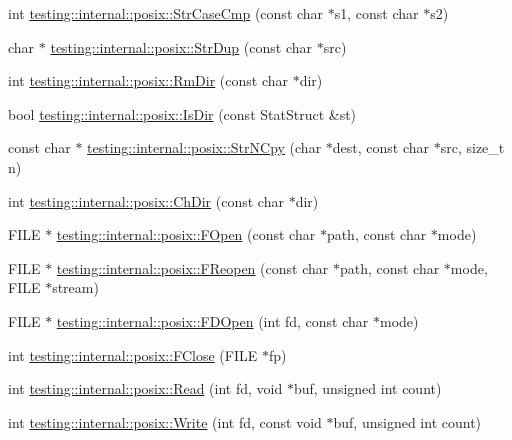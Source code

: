 \begin{DoxyCompactItemize}
\item 
int \mbox{\hyperlink{namespacetesting_1_1internal_1_1posix_a1ef2385a7f8e4c706054da35967e76bd}{testing\+::internal\+::posix\+::\+Str\+Case\+Cmp}} (const char $\ast$s1, const char $\ast$s2)
\item 
char $\ast$ \mbox{\hyperlink{namespacetesting_1_1internal_1_1posix_a8e352884793a65ae8be144676f1a9136}{testing\+::internal\+::posix\+::\+Str\+Dup}} (const char $\ast$src)
\item 
int \mbox{\hyperlink{namespacetesting_1_1internal_1_1posix_acbad5d4ea5b73fd1765f5f760642932a}{testing\+::internal\+::posix\+::\+Rm\+Dir}} (const char $\ast$dir)
\item 
bool \mbox{\hyperlink{namespacetesting_1_1internal_1_1posix_af0d04ed5baeed28353fa38742748a421}{testing\+::internal\+::posix\+::\+Is\+Dir}} (const Stat\+Struct \&st)
\item 
const char $\ast$ \mbox{\hyperlink{namespacetesting_1_1internal_1_1posix_a36fca815713332e5c6dc92c98b6b2574}{testing\+::internal\+::posix\+::\+Str\+N\+Cpy}} (char $\ast$dest, const char $\ast$src, size\+\_\+t n)
\item 
int \mbox{\hyperlink{namespacetesting_1_1internal_1_1posix_a1ddc8a4fc6bb21da372307485591a212}{testing\+::internal\+::posix\+::\+Ch\+Dir}} (const char $\ast$dir)
\item 
F\+I\+LE $\ast$ \mbox{\hyperlink{namespacetesting_1_1internal_1_1posix_a4042201dcc4932641d484e7ddf94de7d}{testing\+::internal\+::posix\+::\+F\+Open}} (const char $\ast$path, const char $\ast$mode)
\item 
F\+I\+LE $\ast$ \mbox{\hyperlink{namespacetesting_1_1internal_1_1posix_a9ef6d089cdae03f9d9e0e6d379c40703}{testing\+::internal\+::posix\+::\+F\+Reopen}} (const char $\ast$path, const char $\ast$mode, F\+I\+LE $\ast$stream)
\item 
F\+I\+LE $\ast$ \mbox{\hyperlink{namespacetesting_1_1internal_1_1posix_af7c268eba32d5a718b36b6b3801302e0}{testing\+::internal\+::posix\+::\+F\+D\+Open}} (int fd, const char $\ast$mode)
\item 
int \mbox{\hyperlink{namespacetesting_1_1internal_1_1posix_af4beeaaa8d62916d5e3b644a1ddfbd6b}{testing\+::internal\+::posix\+::\+F\+Close}} (F\+I\+LE $\ast$fp)
\item 
int \mbox{\hyperlink{namespacetesting_1_1internal_1_1posix_a3c6ab13e581a56f1b02f3eb7536c97fd}{testing\+::internal\+::posix\+::\+Read}} (int fd, void $\ast$buf, unsigned int count)
\item 
int \mbox{\hyperlink{namespacetesting_1_1internal_1_1posix_af4acf9f78d55f815a18b43786511abef}{testing\+::internal\+::posix\+::\+Write}} (int fd, const void $\ast$buf, unsigned int count)

\end{DoxyCompactItemize}
